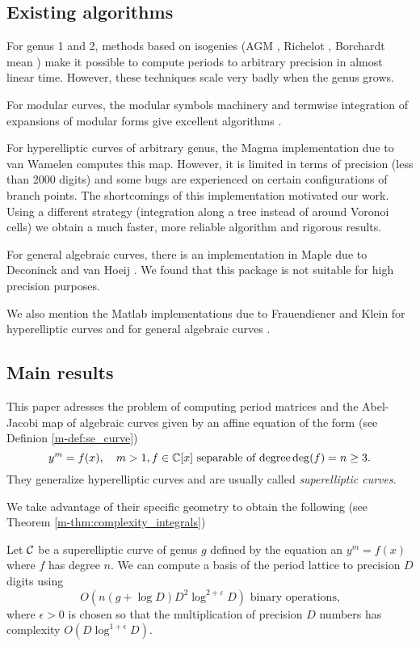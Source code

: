 \documentclass[main.tex]{subfiles}
\begin{document}
  \subsection{Existing algorithms}

  For genus 1 and 2, methods based on isogenies (AGM \cite{CremonaAGM13},
  Richelot \cite{BostMestre88}, Borchardt mean \cite{Labrande16})
  make it possible to compute periods to arbitrary precision in almost
  linear time. However, these techniques scale very badly when the genus grows.

  For modular curves, the modular symbols machinery and termwise integration of
  expansions of modular forms give excellent algorithms
  \cite[\S 3.2]{Mascot13}.

  For hyperelliptic curves of arbitrary genus, the Magma implementation
  due to van Wamelen \cite{vanWamelen06} computes this map.
  However, it is limited in terms of precision (less
  than 2000 digits) and some bugs are experienced on
  certain configurations of branch points. The shortcomings of this implementation motivated our
  work. Using a different strategy
  (integration along a tree instead of around Voronoi cells)
  we obtain a much faster, more reliable algorithm and rigorous results.

  For general algebraic curves, there is an implementation in Maple
  due to Deconinck and van Hoeij \cite{DeconinckvanHoeij01}.
  We found that this package is not suitable for high precision purposes.

  We also mention the Matlab implementations due to Frauendiener and Klein for hyperelliptic curves \cite{FrauendienerKlein2015} 
  and for general algebraic curves \cite{FrauendienerKlein2011}. 
  
  \subsection{Main results}

  This paper adresses the problem of computing period matrices and the
  Abel-Jacobi map of algebraic curves given by an affine equation of the form  (see Definion \ref{m-def:se_curve})
  \begin{equation*}
  y^m = f(x), \quad m > 1, f \in \mathbb{C}[x] \text{ separable of degree} \operatorname{deg}(f) = n \ge 3.
  \end{equation*}
  They generalize
  hyperelliptic curves and are usually called \textit{superelliptic curves}. 
  
  We take advantage of their specific geometry to obtain the following
  (see Theorem \ref{m-thm:complexity_integrals})
  \begin{thm}
      Let $\mathcal{C}$ be a superelliptic curve of genus $g$ defined by the equation an $y^m=f(x)$ 
      where $f$ has degree $n$.
      We can compute a basis of the period lattice to precision
      $D$ digits using $$O(n(g+\log D)D^2\log^{2+\varepsilon} D) \text{ binary operations,}$$
     where $\epsilon>0$ is chosen so that
      the multiplication of precision $D$ numbers has complexity
      $O(D\log^{1+\epsilon}D)$.
  \end{thm}
\end{document}
